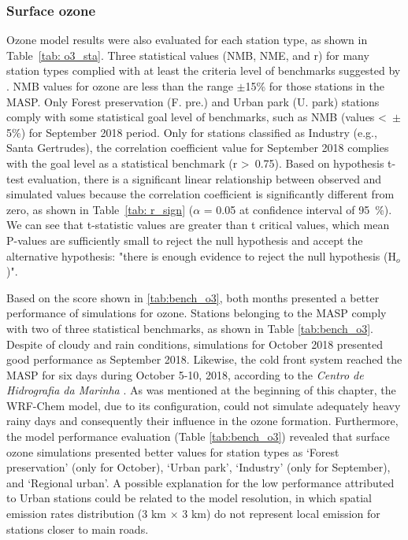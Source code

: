   \subsubsection{Surface ozone}
  Ozone model results were also evaluated for each station type, as shown in Table~\ref{tab: o3_sta}. 
  Three statistical values (NMB, NME, and r) for many station types complied with at least the criteria level of benchmarks suggested by \citet{Emery2017}.
  NMB values for ozone are less than the range $\pm$15\% for those stations in the MASP.
  Only Forest preservation (F. pre.) and Urban park (U. park) stations comply with some statistical goal level of benchmarks, such as NMB (values <~$\pm$5\%) for September 2018 period.
  Only for stations classified as Industry (e.g., Santa Gertrudes), the correlation coefficient value for September 2018 complies with the goal level as a statistical benchmark (r >~0.75).
  Based on hypothesis t-test evaluation, there is a significant linear relationship between observed and simulated values because the correlation coefficient is significantly different from zero, as shown in Table~\ref{tab: r_sign} ($\alpha$ = 0.05 at confidence interval of 95~\%).
  We can see that t-statistic values are greater than t critical values, which mean P-values are sufficiently small to reject the null hypothesis and accept the alternative hypothesis: "there is enough evidence to reject the null hypothesis (H$_o$)".
  
  
  
 Based on the score shown in \ref{tab:bench_o3}, both months presented a better performance of simulations for ozone. 
Stations belonging to the MASP comply with two of three statistical benchmarks, as shown in Table \ref{tab:bench_o3}.
 Despite of cloudy and rain conditions, simulations for October 2018 presented good performance as September 2018.
  Likewise, the cold front system reached the MASP for six days during October 5-10, 2018, according to the \textit{Centro de Hidrografia da Marinha} \citep{CHM2020}.
  As was mentioned at the beginning of this chapter, the WRF-Chem model, due to its configuration, could not simulate adequately heavy rainy days and consequently their influence in the ozone formation.
  Furthermore, the model performance evaluation (Table \ref{tab:bench_o3}) revealed that surface ozone simulations presented better values for station types as `Forest preservation' (only for October), `Urban park', `Industry' (only for September), and `Regional urban'.
  A possible explanation for the low performance attributed to Urban stations could be related to the model resolution, in which spatial emission rates distribution (3 km $\times$ 3 km) do not represent local emission for stations closer to main roads.
  
